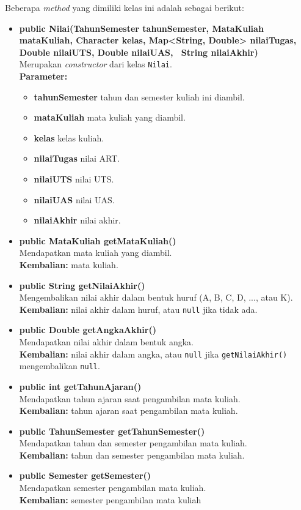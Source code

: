 Beberapa \textit{method} yang dimiliki kelas ini adalah sebagai berikut:
\begin{itemize}
	\item \textbf{public Nilai(TahunSemester tahunSemester, MataKuliah mataKuliah, Character kelas, Map<String, Double> nilaiTugas, Double nilaiUTS, Double nilaiUAS, ~String nilaiAkhir)}\\
	Merupakan \textit{constructor} dari kelas \texttt{Nilai}.\\
	\textbf{Parameter:}
	\begin{itemize}
		\item \textbf{tahunSemester} tahun dan semester kuliah ini diambil.
		\item \textbf{mataKuliah} mata kuliah yang diambil.
		\item \textbf{kelas} kelas kuliah.
		\item \textbf{nilaiTugas} nilai ART.
		\item \textbf{nilaiUTS} nilai UTS.
		\item \textbf{nilaiUAS} nilai UAS.
		\item \textbf{nilaiAkhir} nilai akhir.
	\end{itemize}
		
	\item \textbf{public MataKuliah getMataKuliah()}\\
	Mendapatkan mata kuliah yang diambil.\\
	\textbf{Kembalian:} mata kuliah.
	
	\item \textbf{public String getNilaiAkhir()}\\
	Mengembalikan nilai akhir dalam bentuk huruf (A, B, C, D, ..., atau K).\\
	\textbf{Kembalian:} nilai akhir dalam huruf, atau \texttt{null} jika tidak ada.
	
	\item \textbf{public Double getAngkaAkhir()}\\
	Mendapatkan nilai akhir dalam bentuk angka.\\
	\textbf{Kembalian:}  nilai akhir dalam angka, atau \texttt{null} jika \texttt{getNilaiAkhir()} mengembalikan \texttt{null}.
	
	\item \textbf{public int getTahunAjaran()}\\
	Mendapatkan tahun ajaran saat pengambilan mata kuliah.\\
	\textbf{Kembalian:} tahun ajaran saat pengambilan mata kuliah.

    \item \textbf{public TahunSemester getTahunSemester()}\\
	Mendapatkan tahun dan semester pengambilan mata kuliah.\\
	\textbf{Kembalian:} tahun dan semester pengambilan mata kuliah.	
	
	\item \textbf{public Semester getSemester()}\\
	Mendapatkan semester pengambilan mata kuliah.\\
	\textbf{Kembalian:} semester pengambilan mata kuliah
	
\end{itemize}

